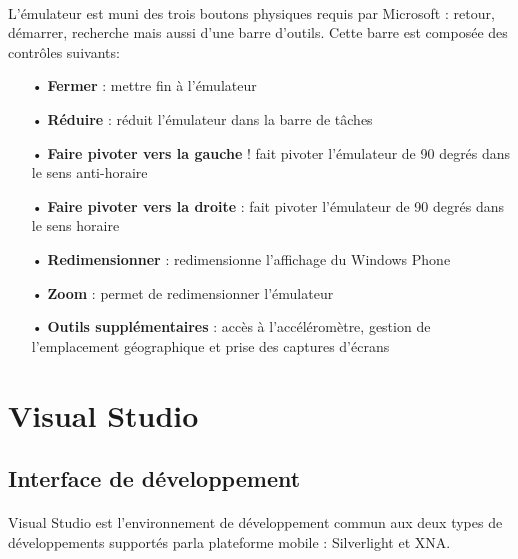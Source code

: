 \documentclass[twoside,UTF8]{EPURapport}
\begin{document}
\paragraph{}
L'émulateur est muni des trois boutons physiques requis par Microsoft : retour, démarrer, recherche mais aussi d'une barre d'outils. Cette barre est composée des contrôles suivants: 
\begin{itemize}
	\item[•]\textbf{Fermer} : mettre fin à l'émulateur
	\item[•]\textbf{Réduire} : réduit l'émulateur dans la barre de tâches
	\item[•]\textbf{Faire pivoter vers la gauche} ! fait pivoter l'émulateur de 90 degrés dans le sens anti-horaire
	\item[•]\textbf{Faire pivoter vers la droite} : fait pivoter l'émulateur de 90 degrés dans le sens horaire
	\item[•]\textbf{Redimensionner} : redimensionne l'affichage du Windows Phone
	\item[•]\textbf{Zoom} : permet de redimensionner l'émulateur
	\item[•]\textbf{Outils supplémentaires} : accès à l'accéléromètre, gestion de l'emplacement géographique et prise des captures d'écrans
\end{itemize}


	\section{Visual Studio}

	\subsection{Interface de développement}	
\paragraph{}
Visual Studio est l'environnement de développement commun aux deux types de développements supportés parla plateforme mobile : Silverlight et XNA.  
\end{document}
